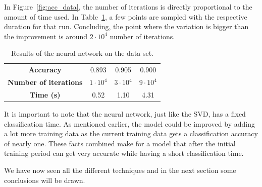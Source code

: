 In Figure~\ref{fig:acc_data}, the number of iterations is directly proportional to the amount of time used. In Table~\ref{tab:neural_results}, a few points are sampled with the respective duration for that run. Concluding, the point where the variation is bigger than the improvement is around \(2\cdot10^4\) number of iterations.

\begin{table}[H]
    \centering
    \caption{Results of the neural network on the data set.}\label{tab:neural_results}
    \begin{tabular}{c c c c}
        \toprule
        \textbf{Accuracy}         & 0.893           & 0.905           & 0.900           \\
        \textbf{Number of iterations} & \(1\cdot 10^4\) & \(3\cdot 10^4\) & \(9\cdot 10^4\) \\
        \textbf{Time (s)}             & 0.52            & 1.10            & 4.31            \\
        \bottomrule
    \end{tabular}
\end{table}

It is important to note that the neural network, just like the SVD, has a fixed classification time.
As mentioned earlier, the model could be improved by adding a lot more training data as the current training data gets a classification accuracy of nearly one.
These facts combined make for a model that after the initial training period can get very accurate while having a short classification time.

We have now seen all the different techniques and in the next section some conclusions will be drawn.